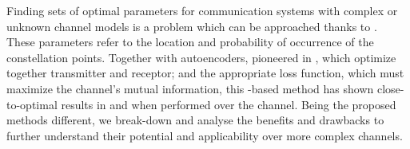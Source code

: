 \label{chap:abstract} %
Finding sets of optimal parameters for communication systems with complex or unknown channel models is a problem which can be approached thanks to . These parameters refer to the location and probability of occurrence of the constellation points. Together with autoencoders, pioneered in \citep{O'Shea}, which optimize together transmitter and receptor; and the appropriate loss function, which must maximize the channel's mutual information, this -based method has shown close-to-optimal results in \cite{Stark} and \cite{Aref} when performed over the  channel. Being the proposed methods different, we break-down and analyse the benefits and drawbacks to further understand their potential and applicability over more complex channels.
